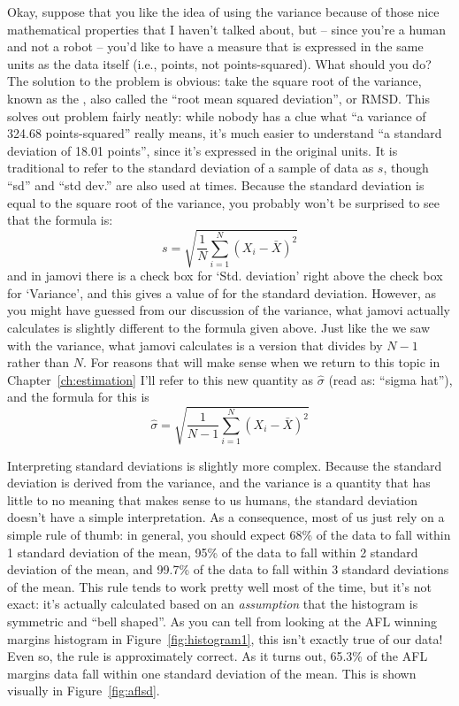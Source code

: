 Okay, suppose that you like the idea of using the variance because of those nice mathematical properties that I haven't talked about, but -- since you're a human and not a robot -- you'd like to have a measure that is expressed in the same units as the data itself (i.e., points, not points-squared). What should you do? The solution to the problem is obvious: take the square root of the variance, known as the , also called the ``root mean squared deviation'', or RMSD. This solves out problem fairly neatly: while nobody has a clue what ``a variance of 324.68 points-squared'' really means, it's much easier to understand ``a standard deviation of 18.01 points'', since it's expressed in the original units. It is traditional to refer to the standard deviation of a sample of data as $s$, though 	``sd'' and ``std dev.'' are also used at times. Because the standard deviation is equal to the square root of the variance, you probably won't be surprised to see that the formula is:
$$
s = \sqrt{ \frac{1}{N} \sum_{i=1}^N \left( X_i - \bar{X} \right)^2 }
$$
and in jamovi there is a check box for `Std. deviation' right above the check box for `Variance', and this gives a value of  for the standard deviation. However, as you might have guessed from our discussion of the variance, what jamovi actually calculates is slightly different to the formula given above. Just like the we saw with the variance, what jamovi calculates is a version that divides by $N-1$ rather than $N$. For reasons that will make sense when we return to this topic in Chapter~\ref{ch:estimation} I'll refer to this new quantity as $\hat\sigma$ (read as: ``sigma hat''), and the formula for this is
$$
\hat\sigma = \sqrt{ \frac{1}{N-1} \sum_{i=1}^N \left( X_i - \bar{X} \right)^2 }
$$

Interpreting standard deviations is slightly more complex. Because the standard deviation is derived from the variance, and the variance is a quantity that has little to no meaning that makes sense to us humans, the standard deviation doesn't have a simple interpretation. As a consequence, most of us just rely on a simple rule of thumb: in general, you should expect 68\% of the data to fall within 1 standard deviation of the mean, 95\% of the data to fall within 2 standard deviation of the mean, and 99.7\% of the data to fall within 3 standard deviations of the mean. This rule tends to work pretty well most of the time, but it's not exact: it's actually calculated based on an {\it assumption} that the histogram is symmetric and ``bell shaped''. As you can tell from looking at the AFL winning margins histogram in Figure~\ref{fig:histogram1}, this isn't exactly true of our data! Even so, the rule is approximately correct. As it turns out, 65.3\% of the AFL margins data fall within one standard deviation of the mean. This is shown visually in Figure~\ref{fig:aflsd}.

